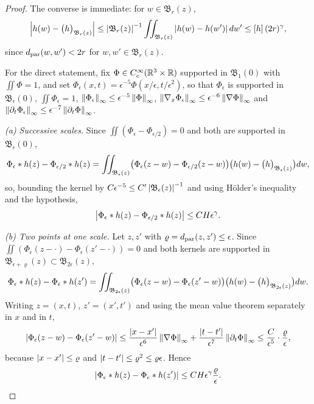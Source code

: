 \documentclass[11pt,reqno]{amsart}
\begin{document}
\begin{proof}
The converse is immediate: for $w\in\mathfrak{B}_{r}(z)$,
\[
\left\lvert h(w)-\bigl(h\bigr)_{\mathfrak{B}_{r}(z)} \right\rvert
 \le\left\lvert \mathfrak{B}_{r}(z) \right\rvert^{-1}\iint_{\mathfrak{B}_{r}(z)}\left\lvert h(w)-h(w') \right\rvert dw'
 \le[h]\,(2r)^{\gamma}
,
\] since $d_{\mathrm{par}}(w,w')<2r$ for $w,w'\in\mathfrak{B}_{r}(z)$.

For the direct statement, fix $\Phi\in C_{c}^{\infty}(\mathbb{R}^{3}\times\mathbb{R})$ supported
in $\mathfrak{B}_{1}(0)$ with $\iint\Phi=1$, and set
$\Phi_{\epsilon}(x,t)=\epsilon^{-5}\Phi(x/\epsilon,t/\epsilon^{2})$, so that
$\Phi_{\epsilon}$ is supported in $\mathfrak{B}_{\epsilon}(0)$,
$\iint\Phi_{\epsilon}=1$,
$\left\lVert \Phi_{\epsilon} \right\rVert_{\infty}\le\epsilon^{-5}\left\lVert \Phi \right\rVert_{\infty}$,
$\left\lVert \nabla_{x}\Phi_{\epsilon} \right\rVert_{\infty}\le\epsilon^{-6}\left\lVert \nabla\Phi \right\rVert_{\infty}$
and
$\left\lVert \partial_{t}\Phi_{\epsilon} \right\rVert_{\infty}\le\epsilon^{-7}\left\lVert \partial_{t}\Phi \right\rVert_{\infty}$.

\emph{(a) Successive scales.} Since $\iint(\Phi_{\epsilon}-\Phi_{\epsilon/2})=0$
and both are supported in $\mathfrak{B}_{\epsilon}(0)$,
\[
  \Phi_{\epsilon}*h(z)-\Phi_{\epsilon/2}*h(z)
  =\iint_{\mathfrak{B}_{\epsilon}(z)}
    \bigl(\Phi_{\epsilon}(z-w)-\Phi_{\epsilon/2}(z-w)\bigr)
    \bigl(h(w)-\bigl(h\bigr)_{\mathfrak{B}_{\epsilon}(z)}\bigr)dw ,
\]
so, bounding the kernel by
$C\epsilon^{-5}\le C'\left\lvert \mathfrak{B}_{\epsilon}(z) \right\rvert^{-1}$ and using
H\"older's inequality and the hypothesis,
\begin{equation}\label{eq:campanato-scales}
  \left\lvert \Phi_{\epsilon}*h(z)-\Phi_{\epsilon/2}*h(z) \right\rvert\le C H\epsilon^{\gamma}.
\end{equation}

\emph{(b) Two points at one scale.} Let $z,z'$ with
$\varrho=d_{\mathrm{par}}(z,z')\le\epsilon$. Since
$\iint(\Phi_{\epsilon}(z-\cdot)-\Phi_{\epsilon}(z'-\cdot))=0$ and both kernels
are supported in $\mathfrak{B}_{\epsilon+\varrho}(z)\subset\mathfrak{B}_{2\epsilon}(z)$,
\[
  \Phi_{\epsilon}*h(z)-\Phi_{\epsilon}*h(z')
  =\iint_{\mathfrak{B}_{2\epsilon}(z)}
    \bigl(\Phi_{\epsilon}(z-w)-\Phi_{\epsilon}(z'-w)\bigr)
    \bigl(h(w)-\bigl(h\bigr)_{\mathfrak{B}_{2\epsilon}(z)}\bigr)dw .
\]
Writing $z=(x,t)$, $z'=(x',t')$ and using the mean value theorem separately in
$x$ and in $t$,
\[
  \left\lvert \Phi_{\epsilon}(z-w)-\Phi_{\epsilon}(z'-w) \right\rvert
  \le\frac{\left\lvert x-x' \right\rvert}{\epsilon^{6}}\left\lVert \nabla\Phi \right\rVert_{\infty}
    +\frac{\left\lvert t-t' \right\rvert}{\epsilon^{7}}\left\lVert \partial_{t}\Phi \right\rVert_{\infty}
  \le\frac{C}{\epsilon^{5}}\cdot\frac{\varrho}{\epsilon},
\]
because $\left\lvert x-x' \right\rvert\le\varrho$ and $\left\lvert t-t' \right\rvert\le\varrho^{2}\le\varrho\epsilon$.
Hence
\begin{equation}\label{eq:campanato-points}
  \left\lvert \Phi_{\epsilon}*h(z)-\Phi_{\epsilon}*h(z') \right\rvert
  \le C H\epsilon^{\gamma}\frac{\varrho}{\epsilon}.
\end{equation}


\end{proof}
\end{document}
